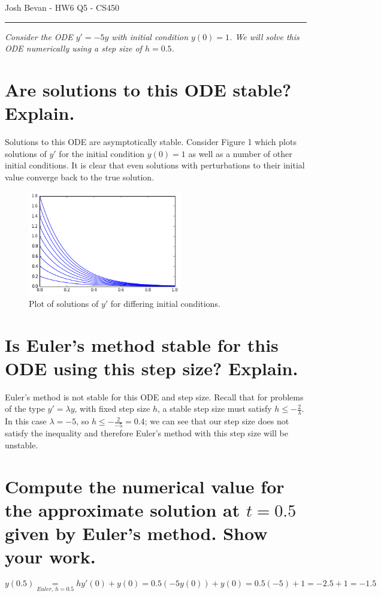 \documentclass[letterpaper,10pt]{article}
\newcommand{\be}{\begin{equation}}
\newcommand{\ee}{\end{equation}}
\begin{document}
\begin{flushright}
{\Large Josh Bevan - HW6 Q5 - CS450}
\end{flushright}
\vskip -0.1in
\hrule
\vskip 0.3in

\textit{Consider the ODE $y'=-5y$ with initial condition $y(0)=1$. We will solve this ODE numerically using a step size of $h=0.5$.}

\section*{Are solutions to this ODE stable? Explain.}
Solutions to this ODE are asymptotically stable. Consider Figure 1 which plots solutions of $y'$ for the initial condition $y(0)=1$ as well as a number of other initial conditions. It is clear that even  solutions with perturbations to their initial value converge back to the true solution.
\begin{figure}[!htb]
\centering
\includegraphics[width=0.6\textwidth]{stable.PNG}
\caption{Plot of solutions of $y'$ for differing initial conditions.}
\end{figure}

\section*{Is Euler's method stable for this ODE using this step size? Explain.}
Euler's method is not stable for this ODE and step size. Recall that for problems of the type $y' = \lambda y$, with fixed step size $h$, a stable step size must satisfy $h \leq -\frac{2}{\lambda}$. In this case $\lambda=-5$, so  $h \leq -\frac{2}{-5}=0.4$; we can see that our step size does not satisfy the inequality and therefore Euler's method with this step size will be unstable.

\section*{Compute the numerical value for the approximate solution at $t=0.5$ given by Euler's method. Show your work.}
\be y(0.5) \underset{Euler, \,h=0.5}{=} hy'(0)+y(0) = 0.5(-5y(0))+y(0) = 0.5(-5)+1 =-2.5+1 = -1.5 \ee
\end{document}
